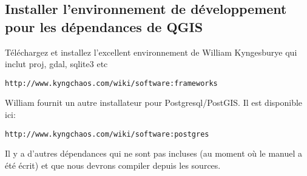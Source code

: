 % 
% 
% 
% 
% 

\subsection{Installer l'environnement de développement pour les dépendances de QGIS}
Téléchargez et installez l'excellent environnement de William Kyngesburye qui inclut proj, gdal, sqlite3 etc

\begin{verbatim}
http://www.kyngchaos.com/wiki/software:frameworks
\end{verbatim}

William fournit un autre installateur pour Postgresql/PostGIS. Il est disponible ici:

\begin{verbatim}
http://www.kyngchaos.com/wiki/software:postgres 
\end{verbatim}

Il y a d'autres dépendances qui ne sont pas incluses (au moment où le manuel a été écrit) et que nous devrons compiler depuis les sources.

% 
% 
% 

